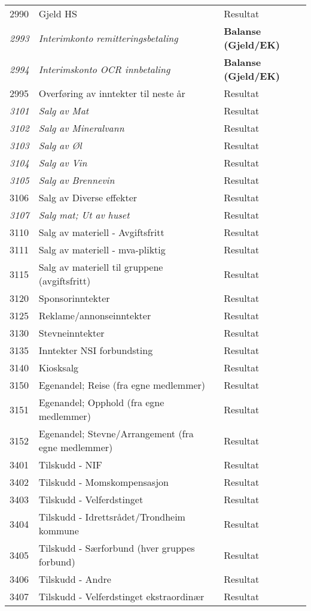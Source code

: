\begin{longtable}{l l l}
2990 & Gjeld HS & Resultat\\
\emph{2993} & \emph{Interimkonto remitteringsbetaling} & {\bfseries Balanse (Gjeld/EK)}\\
\emph{2994} & \emph{Interimskonto OCR innbetaling} & {\bfseries Balanse (Gjeld/EK)}\\
2995 & Overføring av inntekter til neste år & Resultat\\
\emph{3101} & \emph{Salg av Mat} & Resultat\\
\emph{3102} & \emph{Salg av Mineralvann} & Resultat\\
\emph{3103} & \emph{Salg av Øl} & Resultat\\
\emph{3104} & \emph{Salg av Vin} & Resultat\\
\emph{3105} & \emph{Salg av Brennevin} & Resultat\\
3106 & Salg av Diverse effekter & Resultat\\
\emph{3107} & \emph{Salg mat; Ut av huset} & Resultat\\
3110 & Salg av materiell - Avgiftsfritt & Resultat\\
3111 & Salg av materiell - mva-pliktig & Resultat\\
3115 & Salg av materiell til gruppene (avgiftsfritt) & Resultat\\
3120 & Sponsorinntekter & Resultat\\
3125 & Reklame/annonseinntekter & Resultat\\
3130 & Stevneinntekter & Resultat\\
3135 & Inntekter NSI forbundsting & Resultat\\
3140 & Kiosksalg & Resultat\\
3150 & Egenandel; Reise (fra egne medlemmer) & Resultat\\
3151 & Egenandel; Opphold (fra egne medlemmer) & Resultat\\
3152 & Egenandel; Stevne/Arrangement (fra egne medlemmer) & Resultat\\
3401 & Tilskudd - NIF & Resultat\\
3402 & Tilskudd - Momskompensasjon & Resultat\\
3403 & Tilskudd - Velferdstinget & Resultat\\
3404 & Tilskudd - Idrettsrådet/Trondheim kommune & Resultat\\
3405 & Tilskudd - Særforbund (hver gruppes forbund) & Resultat\\
3406 & Tilskudd - Andre & Resultat\\
3407 & Tilskudd - Velferdstinget ekstraordinær & Resultat\\

\end{longtable}
